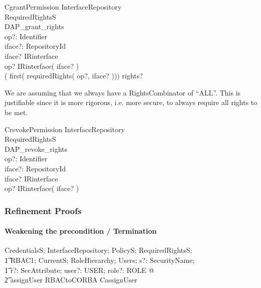 \begin{schema}{CgrantPermission}
  \Xi InterfaceRepository \\
  \Xi RequiredRightsS \\
  DAP\_grant\_rights \\
  op?: Identifier \\
  iface?: RepositoryId \\
  \where
  iface? \in \dom IRinterface \\
  op? \in IRinterface( iface? ) \\

  \ran ( first( requiredRights( op?, iface? ))) \subseteq \ran rights? \\
\end{schema}
We are assuming that we always have a RightsCombinator of ``ALL''.  This is
justifiable since it is more rigorous, i.e. more secure, to always require all
rights to be met.
\begin{schema}{CrevokePermission}
  \Xi InterfaceRepository \\
  \Xi RequiredRightsS \\
  DAP\_revoke\_rights \\
  op?: Identifier \\
  iface?: RepositoryId \\
  \where
  iface? \in \dom IRinterface \\
  op? \in IRinterface( iface? )
\end{schema}


\subsubsection{Refinement Proofs}


\paragraph{Weakening the precondition / Termination}
\begin{zed}
  \forall CredentialsS; InterfaceRepository; PolicyS; RequiredRightsS; \\
  \t1 RBAC1; CurrentS; RoleHierarchy; Users; s?: SecurityName; \\
  \t1 r?: SecAttribute; user?: USER; role?: ROLE @ \\
  \t2 \pre assignUser \land RBACtoCORBA \implies \pre CassignUser
\end{zed}

